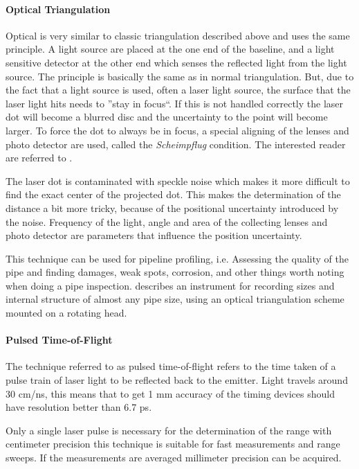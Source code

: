\paragraph{Optical Triangulation}
Optical is very similar to classic triangulation described above and uses the same principle.
A light source are placed at the one end of the
baseline, and a light sensitive detector at the other end which senses the reflected light from the
light source. The principle is basically the same as in normal triangulation. But, due to
the fact that a light source is used, often a laser light source, the surface
that the laser light hits needs to ''stay in focus``. If this is not handled correctly the laser dot will become a
blurred disc and the uncertainty to the point will become larger. To force the dot to
always be in focus, a special aligning of the lenses and photo detector are used, called 
the \emph{Scheimpflug} condition. The interested reader are referred to
\cite{laser-ranging-critical-review}.

The laser dot is contaminated with speckle noise which makes it more difficult to find the
exact center of the projected dot. This makes the determination of the 
distance a bit more tricky, because of the positional uncertainty introduced by the
noise. Frequency of the light, angle and area of the collecting lenses and photo detector
are parameters that influence the position uncertainty. 

This technique can be used for pipeline profiling, i.e. Assessing the quality of the pipe
and finding damages, weak spots, corrosion, and other things worth noting when doing a pipe
inspection. \cite{optical-pipe-inspection} describes an instrument for recording sizes and
internal structure of almost any pipe size, using an optical triangulation scheme mounted
on a rotating head. 


\paragraph{Pulsed Time-of-Flight}
\label{chap2:subsec-lrf}
The technique referred to as pulsed time-of-flight refers to the time taken of a pulse
train of laser light to be reflected back to the emitter. Light travels around 30 cm/ns,
this means that to get 1 mm accuracy of the timing devices should have resolution better
than 6.7 ps.

Only a single laser pulse is necessary for the determination of the range with centimeter
precision this technique is suitable for fast measurements and range sweeps. If the
measurements are averaged millimeter precision can be acquired. 

